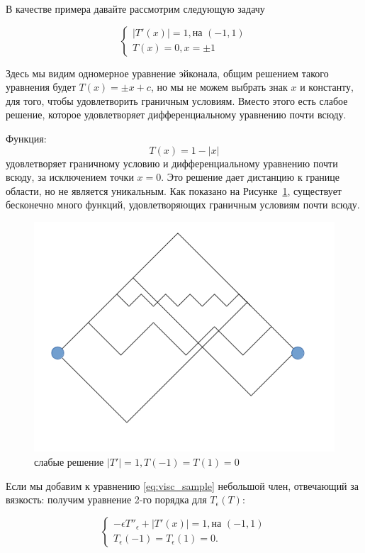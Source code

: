 В качестве примера давайте рассмотрим следующую задачу

\begin{equation}
  \label{eq:visc_sample}
  \left\{ \begin{matrix}
      |T'(x)| = 1,\text{на } (-1,1) \\
      T(x) = 0,x = \pm 1
    \end{matrix}\right.
\end{equation}

Здесь мы видим одномерное уравнение эйконала, общим решением такого
уравнения будет $T(x) = \pm x + c$, но мы не можем выбрать знак $x$ и
константу, для того, чтобы удовлетворить граничным условиям. Вместо
этого есть слабое решение, которое удовлетворяет дифференциальному
уравнению почти всюду.

Функция:
\begin{equation*}
  T(x) = 1 - |x|
\end{equation*}
удовлетворяет граничному условию и дифференциальному уравнению почти
всюду, за исключением точки $x = 0$. Это решение дает дистанцию к
границе области, но не является уникальным. Как показано на
Рисунке~\ref{fig:weak-sol}, существует бесконечно много функций,
удовлетворяющих граничным условиям почти всюду.

\begin{figure}[h]
  \centering
  \includegraphics[width=0.5\linewidth]{img/weak-sol.png}
  \hfil \caption{слабые решение $|T'|=1,T(-1)=T(1)=0$}
  \label{fig:weak-sol}

\end{figure}

Если мы добавим к уравнению \eqref{eq:visc_sample} небольшой член,
отвечающий за вязкость: получим уравнение 2-го порядка для
$T_\epsilon(T)$:

\begin{equation}
  \label{eq:visc_sample_2}
  \left\{ \begin{matrix}
      -\epsilon T''_\epsilon+|T'(x)| = 1,\text{на } (-1,1) \\
      T_\epsilon(-1) = T_\epsilon(1) = 0.
    \end{matrix}\right.
\end{equation}

